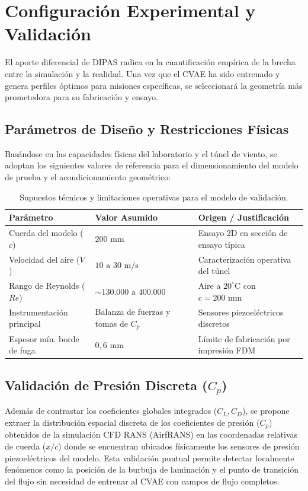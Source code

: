 \section{Configuración Experimental y Validación}
\label{sec:validacion}

El aporte diferencial de DIPAS radica en la cuantificación empírica de la brecha entre la simulación y la realidad. Una vez que el CVAE ha sido entrenado y genera perfiles óptimos para misiones específicas, se seleccionará la geometría más prometedora para su fabricación y ensayo.

\subsection{Parámetros de Diseño y Restricciones Físicas}
Basándose en las capacidades físicas del laboratorio y el túnel de viento, se adoptan los siguientes valores de referencia para el dimensionamiento del modelo de prueba y el acondicionamiento geométrico:
\begin{table}[htbp]
\centering
\caption{Supuestos técnicos y limitaciones operativas para el modelo de validación.}
\label{tab:supuestos_tunel}
\begin{tabular}{lll}
\toprule
\textbf{Parámetro} & \textbf{Valor Asumido} & \textbf{Origen / Justificación} \\
\midrule
Cuerda del modelo ($c$) & $200\text{ mm}$ & Ensayo 2D en sección de ensayo típica \\
Velocidad del aire ($V$) & $10\text{ a }30\text{ m/s}$ & Caracterización operativa del túnel \\
Rango de Reynolds ($Re$) & $\sim 130.000\text{ a }400.000$ & Aire a $20^\circ\text{C}$ con $c=200\text{ mm}$ \\
Instrumentación principal & Balanza de fuerzas y tomas de $C_p$ & Sensores piezoeléctricos discretos \\
Espesor mín. borde de fuga & $0,6\text{ mm}$ & Límite de fabricación por impresión FDM \\
\bottomrule
\end{tabular}
\end{table}

\subsection{Validación de Presión Discreta ($C_p$)}
Además de contrastar los coeficientes globales integrados ($C_L, C_D$), se propone extraer la distribución espacial discreta de los coeficientes de presión ($C_p$) obtenidos de la simulación CFD RANS (AirfRANS) en las coordenadas relativas de cuerda ($x/c$) donde se encuentran ubicados físicamente los sensores de presión piezoeléctricos del modelo. Esta validación puntual permite detectar localmente fenómenos como la posición de la burbuja de laminación y el punto de transición del flujo sin necesidad de entrenar al CVAE con campos de flujo completos.

